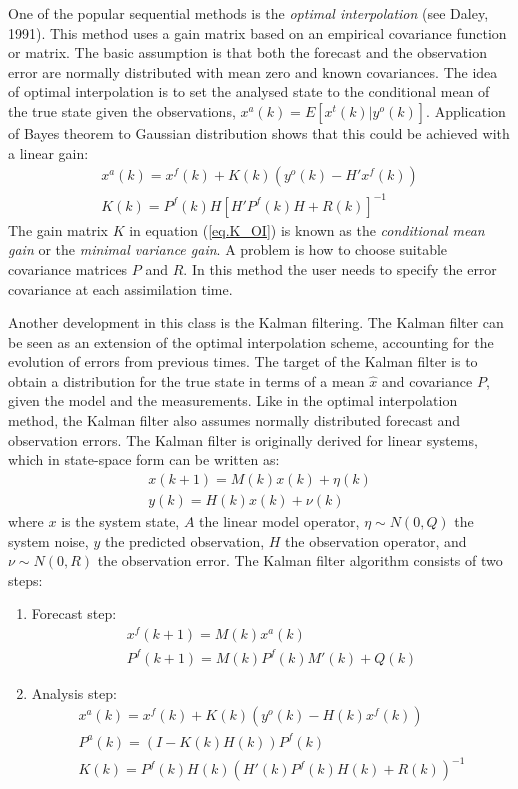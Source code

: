 \documentclass[a4paper,12pt]{article}
\begin{document}
      One of the popular sequential methods is the \emph{optimal interpolation} (see Daley, 1991). This method uses a gain matrix based on an empirical covariance function or matrix. The basic assumption is that both the forecast and the observation error are normally distributed with mean zero and known covariances. The idea of optimal interpolation is to set the analysed state to the conditional mean of the true state given the observations, $x^a(k)=E[x^t(k)|y^o(k)]$. Application of Bayes theorem to Gaussian distribution shows that this could be achieved with a linear gain:
      \begin{eqnarray}
          x^a(k)=x^f(k)+K(k)(y^o(k)-H'x^f(k)) \\
          K(k)=P^f(k) H [H' P^f(k) H + R(k)]^{-1} \label{eq.K_OI}
      \end{eqnarray}
      The gain matrix $K$ in equation (\ref{eq.K_OI}) is known as the \emph{conditional mean gain} or the \emph{minimal variance gain}. A problem is how to choose suitable covariance matrices $P$ and $R$. In this method the user needs to specify the error covariance at each assimilation time.

      Another development in this class is the Kalman filtering. The Kalman filter can be seen as an extension of the optimal interpolation scheme, accounting for the evolution of errors from previous times. The target of the Kalman filter is to obtain a distribution for the true state in terms of a mean $\hat{x}$ and covariance $P$, given the model and the measurements. Like in the optimal interpolation method, the Kalman filter also assumes normally distributed forecast and observation errors. The Kalman filter is originally derived for linear systems, which in state-space form can be written as:
      \begin{eqnarray}
          x(k+1)= M(k) x(k) + \eta(k) \\
          y(k) = H(k) x(k) + \nu(k)
      \end{eqnarray}
      where $x$ is the system state, $A$ the linear model operator, $\eta \sim N(0,Q)$ the system noise, $y$ the predicted observation, $H$ the observation operator, and $\nu \sim N(0,R)$ the observation error. The Kalman filter algorithm consists of two steps:
      \begin{enumerate}
       \item Forecast step:
             \begin{eqnarray}
                x^f(k+1) = M(k) x^a(k) \\
                P^f(k+1) = M(k) P^f(k) M'(k) + Q(k)
             \end{eqnarray}
       \item Analysis step:
             \begin{eqnarray}
                x^a(k)=x^f(k) + K(k) (y^o(k) - H(k) x^f(k)) \\
                P^a(k)=(I-K(k) H(k)) P^f(k) \\
                K(k) = P^f(k) H(k) (H'(k) P^f(k) H(k) + R(k))^{-1}
             \end{eqnarray}
      \end{enumerate}
\end{document}
